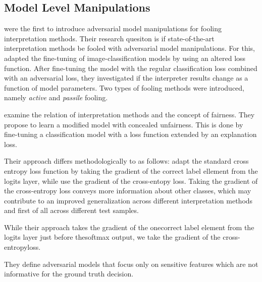 \subsection{Model Level Manipulations}

\cite{fooling_nn_interpreters} were the first to introduce adversarial model manipulations for fooling interpretation methods. 
Their research quesiton is if state-of-the-art interpretation methods be fooled with adversarial model manipulations. For this, adapted the fine-tuning of image-classification models by using an altered loss function. 
After fine-tuning the model with the regular classification loss combined with an adversarial loss, they investigated if the interpreter results change as a function of model parameters. 
Two types of fooling methods were introduced, namely \textit{active} and \textit{passile} fooling. 




\cite{dimanov2020you} examine the relation of interpretation methods and the concept of fairness. They propose to learn a modified model with concealed unfairness. This is done by fine-tuning a classification model with a loss function extended by an explanation loss. 

Their approach differs methodologically to \cite{fooling_nn_interpreters} as follows: 
\cite{fooling_nn_interpreters} adapt the standard cross entropy loss function by taking the gradient of the correct label ellement from the logits layer, while \cite{dimanov2020you} use the gradient of the cross-entopy loss. 
Taking the gradient of the cross-entropy loss conveys more information about other classes, which may contribute to an improved generalization across different interpretation methods and first of all across different test samples. 

While their approach takes the gradient of the onecorrect label element from the logits layer just before thesoftmax output, we take the gradient of the cross-entropyloss. 

They define adversarial models that focus only on sensitive features which are not informative for the ground truth decision. 


